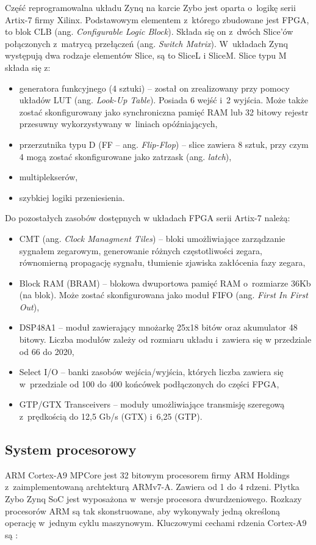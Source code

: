 Część reprogramowalna układu Zynq na karcie Zybo jest oparta o~logikę serii  Artix-7 firmy Xilinx. 
Podstawowym elementem z~którego zbudowane jest FPGA, to blok CLB (ang. \textit{Configurable Logic Block}). 
Składa się on z~dwóch Slice'ów połączonych z~matrycą przełączeń (ang. \textit{Switch Matrix}). 
W~układach Zynq występują dwa rodzaje elementów Slice, są to SliceL i SliceM. 
Slice typu M składa się z:
\begin{itemize}
	\item generatora funkcyjnego (4 sztuki) -- został on zrealizowany przy pomocy układów LUT (ang. \textit{Look-Up Table}). Posiada 6 wejść i~2 wyjścia. Może także zostać skonfigurowany jako synchroniczna pamięć RAM lub 32 bitowy rejestr przesuwny wykorzystywany w~liniach opóźniających,
	\item przerzutnika typu D (FF -- ang. \textit{Flip-Flop}) -- slice zawiera 8 sztuk, przy czym 4 mogą zostać skonfigurowane jako zatrzask (ang. \textit{latch}),
	\item multiplekserów,
	\item szybkiej logiki przeniesienia.
\end{itemize}

Do pozostałych zasobów dostępnych w układach FPGA serii Artix-7 należą:
\begin{itemize}
	\item CMT (ang. \textit{Clock Managment Tiles}) -- bloki umożliwiające zarządzanie sygnałem zegarowym, generowanie różnych częstotliwości zegara, równomierną propagację sygnału, tłumienie zjawiska zakłócenia fazy zegara,
	\item Block RAM (BRAM) -- blokowa dwuportowa pamięć RAM o~rozmiarze 36Kb (na blok). Może zostać skonfigurowana jako moduł FIFO (ang. \textit{First In First Out}),
	\item DSP48A1 -- moduł zawierający mnożarkę 25x18 bitów oraz akumulator 48 bitowy. Liczba modułów zależy od rozmiaru układu i~zawiera się w przedziale od 66 do 2020,
	\item Select I/O -- banki zasobów wejścia/wyjścia, których liczba zawiera się w~przedziale od 100 do 400 końcówek podłączonych do części FPGA, 
	\item GTP/GTX Transceivers -- moduły umożliwiające transmisję szeregową z~prędkością do 12,5 Gb/s (GTX) i~6,25 (GTP).
\end{itemize}

\subsection{System procesorowy}
ARM Cortex-A9 MPCore jest 32 bitowym procesorem firmy ARM Holdings z~zaimplementowaną archtekturą ARMv7-A. 
Zawiera od 1 do 4 rdzeni. 
Płytka Zybo Zynq SoC jest wyposażona w~wersje procesora dwurdzeniowego.
Rozkazy procesorów ARM są tak skonstruowane, aby wykonywały jedną określoną operację w~jednym cyklu maszynowym.
Kluczowymi cechami rdzenia Cortex-A9 są \cite{armCortex}:

